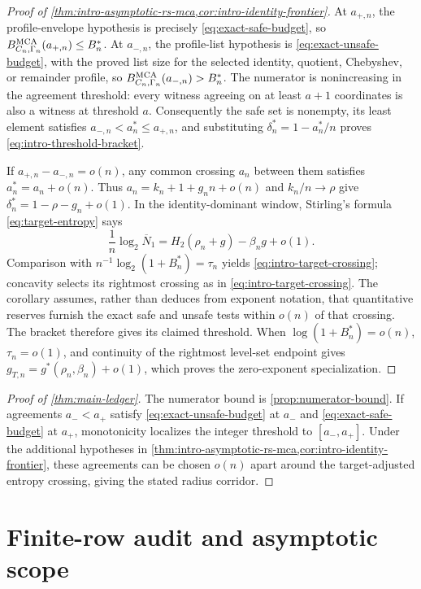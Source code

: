 \documentclass[12pt,a4paper]{amsart}
\numberwithin{equation}{section}
\theoremstyle{remark}
\newcommand{\barN}{\overline N}
\begin{document}
\begin{proof}[Proof of
\cref{thm:intro-asymptotic-rs-mca,cor:intro-identity-frontier}]
At \(a_{+,n}\), the profile-envelope hypothesis is precisely
\eqref{eq:exact-safe-budget}, so
\(B_{C_n,\Gamma_n}^{\rm MCA}(a_{+,n})\le B_n^*\).  At
\(a_{-,n}\), the profile-list hypothesis is
\eqref{eq:exact-unsafe-budget}, with the proved list size for the selected
identity, quotient, Chebyshev, or remainder profile, so
\(B_{C_n,\Gamma_n}^{\rm MCA}(a_{-,n})>B_n^*\).  The numerator is
nonincreasing in the agreement threshold: every witness agreeing on at
least \(a+1\) coordinates is also a witness at threshold \(a\).
Consequently the safe set is nonempty, its least element satisfies
\(a_{-,n}<a_n^*\le a_{+,n}\), and substituting
\(\delta_n^*=1-a_n^*/n\) proves
\eqref{eq:intro-threshold-bracket}.

If \(a_{+,n}-a_{-,n}=o(n)\), any common crossing \(a_n\) between them
satisfies \(a_n^*=a_n+o(n)\).  Thus
\(a_n=k_n+1+g_nn+o(n)\) and \(k_n/n\to\rho\) give
\(\delta_n^*=1-\rho-g_n+o(1)\).  In the identity-dominant window,
Stirling's formula \eqref{eq:target-entropy} says
\[
 \frac1n\log_2\barN_1
 =H_2(\rho_n+g)-\beta_ng+o(1).
\]
Comparison with \(n^{-1}\log_2(1+B_n^*)=\tau_n\) yields
\eqref{eq:intro-target-crossing}; concavity selects its rightmost crossing
as in \eqref{eq:intro-target-crossing}.  The corollary assumes, rather than
deduces from exponent notation, that quantitative reserves furnish the
exact safe and unsafe tests within \(o(n)\) of that crossing.  The bracket
therefore gives its claimed threshold.  When
\(\log(1+B_n^*)=o(n)\), \(\tau_n=o(1)\), and continuity of the rightmost
level-set endpoint gives
\(g_{T,n}=g^*(\rho_n,\beta_n)+o(1)\), which proves the zero-exponent
specialization.
\end{proof}

\begin{proof}[Proof of \cref{thm:main-ledger}]
The numerator bound is \cref{prop:numerator-bound}.  If agreements
\(a_-<a_+\) satisfy \eqref{eq:exact-unsafe-budget} at \(a_-\) and
\eqref{eq:exact-safe-budget} at \(a_+\), monotonicity localizes the integer
threshold to \([a_-,a_+]\).  Under the additional hypotheses in
\cref{thm:intro-asymptotic-rs-mca,cor:intro-identity-frontier}, these
agreements can be chosen \(o(n)\) apart around the target-adjusted entropy
crossing, giving the stated radius corridor.
\end{proof}

\section{Finite-row audit and asymptotic scope}\label{sec:finite-scope}
\end{document}
